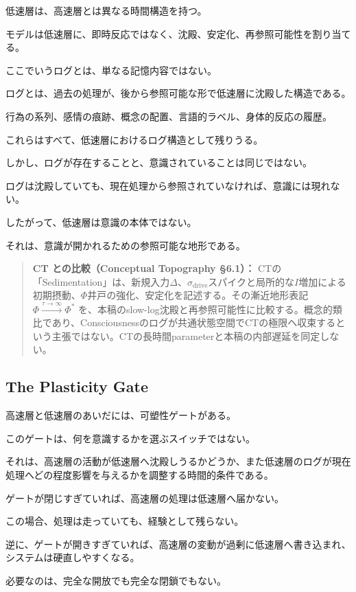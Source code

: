 低速層は、高速層とは異なる時間構造を持つ。

モデルは低速層に、即時反応ではなく、沈殿、安定化、再参照可能性を割り当てる。

ここでいうログとは、単なる記憶内容ではない。

ログとは、過去の処理が、後から参照可能な形で低速層に沈殿した構造である。

行為の系列、感情の痕跡、概念の配置、言語的ラベル、身体的反応の履歴。

これらはすべて、低速層におけるログ構造として残りうる。

しかし、ログが存在することと、意識されていることは同じではない。

ログは沈殿していても、現在処理から参照されていなければ、意識には現れない。

したがって、低速層は意識の本体ではない。

それは、意識が開かれるための参照可能な地形である。

\begin{quote}
\textbf{CT との比較（Conceptual Topography §6.1）：} CTの「Sedimentation」は、新規入力$\Delta$、$\sigma_{\text{drive}}$スパイクと局所的な$I$増加による初期摂動、$\Phi$井戸の強化、安定化を記述する。その漸近地形表記 $\Phi \xrightarrow{\tau\to\infty} \Phi^*$ を、本稿のslow-log沈殿と再参照可能性に比較する。概念的類比であり、Consciousnessのログが共通状態空間でCTの極限へ収束するという主張ではない。CTの長時間parameterと本稿の内部遅延を同定しない。
\end{quote}

\subsection{The Plasticity Gate}

高速層と低速層のあいだには、可塑性ゲートがある。

このゲートは、何を意識するかを選ぶスイッチではない。

それは、高速層の活動が低速層へ沈殿しうるかどうか、また低速層のログが現在処理へどの程度影響を与えるかを調整する時間的条件である。

ゲートが閉じすぎていれば、高速層の処理は低速層へ届かない。

この場合、処理は走っていても、経験として残らない。

逆に、ゲートが開きすぎていれば、高速層の変動が過剰に低速層へ書き込まれ、システムは硬直しやすくなる。

必要なのは、完全な開放でも完全な閉鎖でもない。

